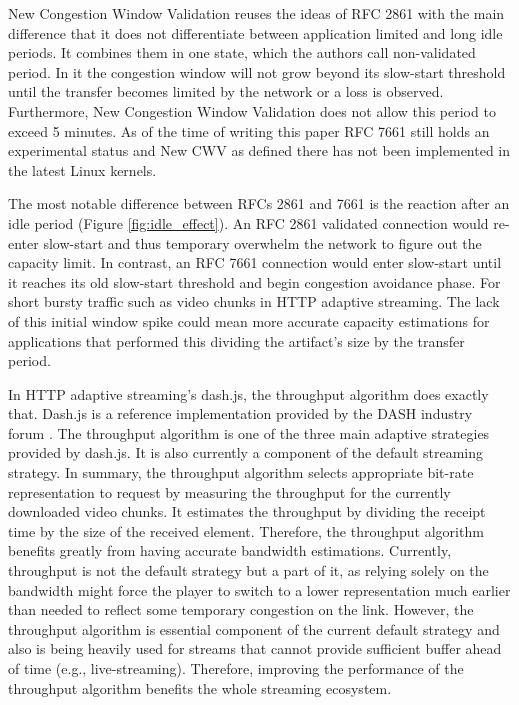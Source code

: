 \documentclass[10pt,sigconf]{acmart}
\begin{document}
New Congestion Window Validation reuses the ideas of RFC 2861 with the main difference that it does not differentiate between application limited and long idle periods. It combines them in one state, which the authors call non-validated period. In it the congestion window will not grow beyond its slow-start threshold until the transfer becomes limited by the network or a loss is observed. Furthermore, New Congestion Window Validation does not allow this period to exceed 5 minutes. As of the time of writing this paper RFC 7661 still holds an experimental status and New CWV as defined there has not been implemented in the latest Linux kernels.

The most notable difference between RFCs 2861 and 7661 is the reaction after an idle period (Figure \ref{fig:idle_effect}). An RFC 2861 validated connection would re-enter slow-start and thus temporary overwhelm the network to figure out the capacity limit. In contrast, an RFC 7661 connection would enter slow-start until it reaches its old slow-start threshold and begin congestion avoidance phase. For short bursty traffic such as video chunks in HTTP adaptive streaming. The lack of this initial window spike could mean more accurate capacity estimations for applications that performed this dividing the artifact's size by the transfer period.

In HTTP adaptive streaming's dash.js, the throughput algorithm does exactly that. Dash.js is a reference implementation provided by the DASH industry forum \cite{online-dashif}. The throughput algorithm is one of the three main adaptive strategies provided by dash.js. It is also currently a component of the default streaming strategy. In summary, the throughput algorithm selects appropriate bit-rate representation to request by measuring the throughput for the currently downloaded video chunks. It estimates the throughput by dividing the receipt time by the size of the received element. Therefore, the throughput algorithm benefits greatly from having accurate bandwidth estimations. Currently, throughput is not the default strategy but a part of it, as relying solely on the bandwidth might force the player to switch to a lower representation much earlier than needed to reflect some temporary congestion on the link. However, the throughput algorithm is essential component of the current default strategy and also is being heavily used for streams that cannot provide sufficient buffer ahead of time (e.g., live-streaming). Therefore, improving the performance of the throughput algorithm benefits the whole streaming ecosystem.
\end{document}
